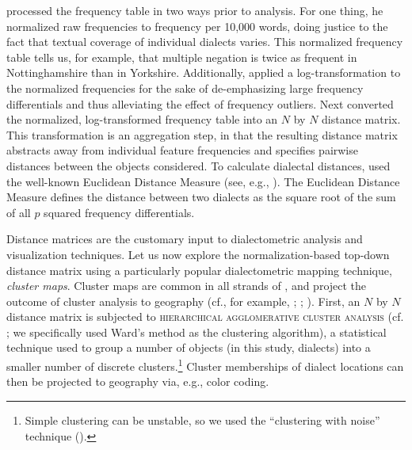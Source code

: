 \documentclass[output=paper]{LSP/langsci}
\begin{document}
\citet{szmrecsanyi_grammatical_2013} processed the frequency table in two ways prior to analysis. For one thing, he normalized raw frequencies to frequency per 10,000 words, doing justice to the fact that textual coverage of individual dialects varies. This normalized frequency table tells us, for example, that multiple negation is twice as frequent in Nottinghamshire than in Yorkshire. Additionally, \citeauthor{szmrecsanyi_grammatical_2013} applied a log-transformation to the normalized frequencies for the sake of de-emphasizing large frequency differentials and thus alleviating the effect of frequency outliers. Next \citeauthor{szmrecsanyi_grammatical_2013} converted the normalized, log-transformed frequency table into an $N$ by $N$ distance matrix. This transformation is an aggregation step, in that the resulting distance matrix abstracts away from individual feature frequencies and specifies pairwise distances between the objects considered. To calculate dialectal distances, \citeauthor{szmrecsanyi_grammatical_2013} used the well-known Euclidean Distance Measure (see, e.g., \citealt[25]{aldenderfer_cluster_1984}). The Euclidean Distance Measure defines the distance between two dialects as the square root of the sum of all $p$ squared frequency differentials.

Distance matrices are the customary input to dialectometric analysis and visualization techniques. Let us now explore the normalization-based top-down distance matrix using a particularly popular dialectometric mapping technique, \emph{cluster maps}. Cluster maps are common in all strands of , and project the outcome of cluster analysis to geography (cf., for example, \citealt[Map 18]{goebl_bunch_2007}; \citealt[Figure 5]{nerbonne_dialektklassifikation_2005}; \citealt[Figure 9.6]{heeringa_measuring_2004}). First, an $N$ by $N$ distance matrix is subjected to \textsc{hierarchical agglomerative cluster analysis} (cf. \citealt{jain_data_1999}; we specifically used Ward's method as the clustering algorithm), a statistical technique used to group a number of objects (in this study, dialects) into a smaller number of discrete clusters.\footnote{Simple clustering can be unstable, so we used the ``clustering with noise'' technique (\citealt{nerbonne_projecting_2008}).} Cluster memberships of dialect locations can then be projected to geography via, e.g., color coding.
\end{document}
